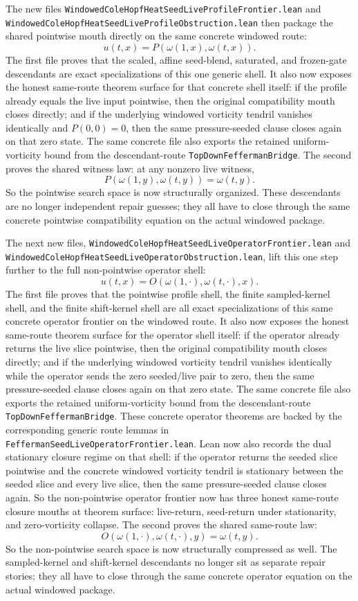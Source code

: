 \documentclass[11pt]{article}
\begin{document}
The new files
\texttt{WindowedColeHopfHeatSeedLiveProfileFrontier.lean} and
\texttt{WindowedColeHopfHeatSeedLiveProfileObstruction.lean} then package the
shared pointwise mouth directly on the same concrete windowed route:
\[
u(t,x)=P(\omega(1,x),\omega(t,x)).
\]
The first file proves that the scaled, affine seed-blend, saturated, and
frozen-gate descendants are exact specializations of this one generic shell.
It also now exposes the honest same-route theorem surface for that concrete
shell itself: if the profile already equals the live input pointwise, then the
original compatibility mouth closes directly; and if the underlying windowed
vorticity tendril vanishes identically and \(P(0,0)=0\), then the same
pressure-seeded clause closes again on that zero state.  The same concrete file
also exports the retained uniform-vorticity bound from the descendant-route
\texttt{TopDownFeffermanBridge}.
The second proves the shared witness law: at any nonzero live witness,
\[
  P(\omega(1,y),\omega(t,y))=\omega(t,y).
\]
So the pointwise search space is now structurally organized.  These descendants
are no longer independent repair guesses; they all have to close through the
same concrete pointwise compatibility equation on the actual windowed package.

The next new files,
\texttt{WindowedColeHopfHeatSeedLiveOperatorFrontier.lean} and
\texttt{WindowedColeHopfHeatSeedLiveOperatorObstruction.lean}, lift this one
step further to the full non-pointwise operator shell:
\[
u(t,x)=O(\omega(1,\cdot),\omega(t,\cdot),x).
\]
The first file proves that the pointwise profile shell, the finite
sampled-kernel shell, and the finite shift-kernel shell are all exact
specializations of this same concrete operator frontier on the windowed route.
It also now exposes the honest same-route theorem surface for the operator
shell itself: if the operator already returns the live slice pointwise, then
the original compatibility mouth closes directly; and if the underlying
windowed vorticity tendril vanishes identically while the operator sends the
zero seeded/live pair to zero, then the same pressure-seeded clause closes
again on that zero state.  The same concrete file also exports the retained
uniform-vorticity bound from the descendant-route
\texttt{TopDownFeffermanBridge}.  These concrete operator theorems are backed
by the corresponding generic route lemmas in
\texttt{FeffermanSeedLiveOperatorFrontier.lean}.  Lean now also records the
dual stationary closure regime on that shell: if the operator returns the
seeded slice pointwise and the concrete windowed vorticity tendril is
stationary between the seeded slice and every live slice, then the same
pressure-seeded clause closes again.  So the non-pointwise operator frontier
now has three honest same-route closure mouths at theorem surface: live-return,
seed-return under stationarity, and zero-vorticity collapse.
The second proves the shared same-route law:
\[
  O(\omega(1,\cdot),\omega(t,\cdot),y)=\omega(t,y).
\]
So the non-pointwise search space is now structurally compressed as well.  The
sampled-kernel and shift-kernel descendants no longer sit as separate repair
stories; they all have to close through the same concrete operator equation on
the actual windowed package.
\end{document}
